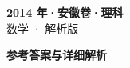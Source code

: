 \documentclass[zihao=-4, a4paper]{ctexart}
\begin{document}
\begin{center}
  {\Large\bfseries 2014 年·安徽卷·理科}\\[4pt]
  {\large 数学 · 解析版}
\end{center}
\medskip
{}

\clearpage
{}
\begin{center}{\Large\bfseries 参考答案与详细解析}\end{center}
\medskip

\end{document}
